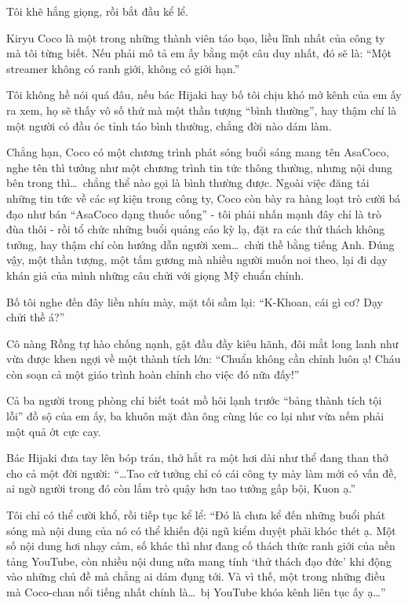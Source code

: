 \documentclass[../main.tex]{subfiles}
\begin{document}
Tôi khẽ hắng giọng, rồi bắt đầu kể lể.

Kiryu Coco là một trong những thành viên táo bạo, liều lĩnh nhất của công ty mà tôi từng biết. Nếu phải mô tả em ấy bằng một câu duy nhất, đó sẽ là: ``Một streamer không có ranh giới, không có giới hạn.''

Tôi không hề nói quá đâu, nếu bác Hijaki hay bố tôi chịu khó mở kênh của em ấy ra xem, họ sẽ thấy vô số thứ mà một thần tượng ``bình thường'', hay thậm chí là một người có đầu óc tỉnh táo bình thường, chẳng đời nào dám làm.

Chẳng hạn, Coco có một chương trình phát sóng buổi sáng mang tên AsaCoco, nghe tên thì tưởng như một chương trình tin tức thông thường, nhưng nội dung bên trong thì\dots\ chẳng thể nào gọi là bình thường được. Ngoài việc đăng tải những tin tức về các sự kiện trong công ty, Coco còn bày ra hàng loạt trò cười bá đạo như bán ``AsaCoco dạng thuốc uống'' - tôi phải nhấn mạnh đây chỉ là trò đùa thôi - rồi tổ chức những buổi quảng cáo kỳ lạ, đặt ra các thử thách không tưởng, hay thậm chí còn hướng dẫn người xem\dots\ chửi thề bằng tiếng Anh. Đúng vậy, một thần tượng, một tấm gương mà nhiều người muốn noi theo, lại đi dạy khán giả của mình những câu chửi với giọng Mỹ chuẩn chỉnh.

Bố tôi nghe đến đây liền nhíu mày, mặt tối sầm lại: ``K-Khoan, cái gì cơ? Dạy chửi thề á?''

Cô nàng Rồng tự hào chống nạnh, gật đầu đầy kiêu hãnh, đôi mắt long lanh như vừa được khen ngợi về một thành tích lớn: ``Chuẩn không cần chỉnh luôn ạ! Cháu còn soạn cả một giáo trình hoàn chỉnh cho việc đó nữa đấy!''

Cả ba người trong phòng chỉ biết toát mồ hôi lạnh trước ``bảng thành tích tội lỗi'' đồ sộ của em ấy, ba khuôn mặt đàn ông cùng lúc co lại như vừa nếm phải một quả ớt cực cay.

Bác Hijaki đưa tay lên bóp trán, thở hắt ra một hơi dài như thể đang than thở cho cả một đời người: ``\dots Tao cứ tưởng chỉ có cái công ty mày làm mới có vấn đề, ai ngờ người trong đó còn lắm trò quậy hơn tao tưởng gấp bội, Kuon ạ.''

Tôi chỉ có thể cười khổ, rồi tiếp tục kể lể: ``Đó là chưa kể đến những buổi phát sóng mà nội dung của nó có thể khiến đội ngũ kiểm duyệt phải khóc thét ạ. Một số nội dung hơi nhạy cảm, số khác thì như đang cố thách thức ranh giới của nền tảng YouTube, còn nhiều nội dung nữa mang tính `thử thách đạo đức' khi động vào những chủ đề mà chẳng ai dám đụng tới. Và vì thế, một trong những điều mà Coco-chan nổi tiếng nhất chính là\dots\ bị YouTube khóa kênh liên tục ấy ạ\dots''
\end{document}
